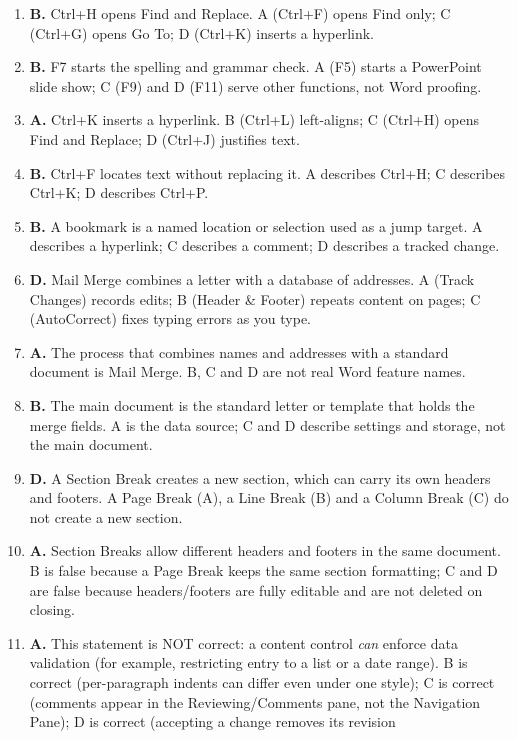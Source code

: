 \begin{enumerate}[label=\textbf{Q\arabic*.}, leftmargin=*]
\item \textbf{B.} Ctrl+H opens Find and Replace. A (Ctrl+F) opens Find only;
  C (Ctrl+G) opens Go To; D (Ctrl+K) inserts a hyperlink.
\item \textbf{B.} F7 starts the spelling and grammar check. A (F5) starts a
  PowerPoint slide show; C (F9) and D (F11) serve other functions, not Word
  proofing.
\item \textbf{A.} Ctrl+K inserts a hyperlink. B (Ctrl+L) left-aligns; C
  (Ctrl+H) opens Find and Replace; D (Ctrl+J) justifies text.
\item \textbf{B.} Ctrl+F locates text without replacing it. A describes
  Ctrl+H; C describes Ctrl+K; D describes Ctrl+P.
\item \textbf{B.} A bookmark is a named location or selection used as a jump
  target. A describes a hyperlink; C describes a comment; D describes a
  tracked change.
\item \textbf{D.} Mail Merge combines a letter with a database of addresses.
  A (Track Changes) records edits; B (Header \& Footer) repeats content on
  pages; C (AutoCorrect) fixes typing errors as you type.
\item \textbf{A.} The process that combines names and addresses with a
  standard document is Mail Merge. B, C and D are not real Word feature names.
\item \textbf{B.} The main document is the standard letter or template that
  holds the merge fields. A is the data source; C and D describe settings and
  storage, not the main document.
\item \textbf{D.} A Section Break creates a new section, which can carry its
  own headers and footers. A Page Break (A), a Line Break (B) and a Column
  Break (C) do not create a new section.
\item \textbf{A.} Section Breaks allow different headers and footers in the
  same document. B is false because a Page Break keeps the same section
  formatting; C and D are false because headers/footers are fully editable and
  are not deleted on closing.
\item \textbf{A.} This statement is NOT correct: a content control \emph{can}
  enforce data validation (for example, restricting entry to a list or a date
  range). B is correct (per-paragraph indents can differ even under one
  style); C is correct (comments appear in the Reviewing/Comments pane, not the
  Navigation Pane); D is correct (accepting a change removes its revision

\end{enumerate}
